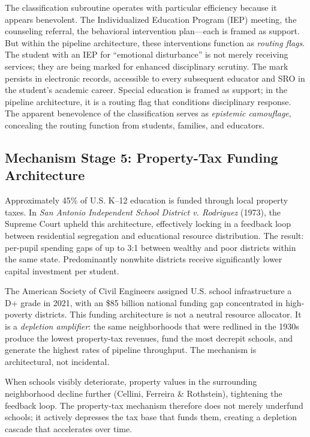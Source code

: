 The classification subroutine operates with particular efficiency because it appears benevolent. The Individualized Education Program (IEP) meeting, the counseling referral, the behavioral intervention plan---each is framed as support. But within the pipeline architecture, these interventions function as \textit{routing flags}. The student with an IEP for ``emotional disturbance'' is not merely receiving services; they are being marked for enhanced disciplinary scrutiny. The mark persists in electronic records, accessible to every subsequent educator and SRO in the student's academic career. Special education is framed as support; in the pipeline architecture, it is a routing flag that conditions disciplinary response. The apparent benevolence of the classification serves as \textit{epistemic camouflage}, concealing the routing function from students, families, and educators.

\subsection{Mechanism Stage 5: Property-Tax Funding Architecture}

Approximately 45\% of U.S. K--12 education is funded through local property taxes. In \textit{San Antonio Independent School District v. Rodriguez} (1973), the Supreme Court upheld this architecture, effectively locking in a feedback loop between residential segregation and educational resource distribution. The result: per-pupil spending gaps of up to 3:1 between wealthy and poor districts within the same state. Predominantly nonwhite districts receive significantly lower capital investment per student.

The American Society of Civil Engineers assigned U.S. school infrastructure a D+ grade in 2021, with an \$85 billion national funding gap concentrated in high-poverty districts. This funding architecture is not a neutral resource allocator. It is a \textit{depletion amplifier}: the same neighborhoods that were redlined in the 1930s produce the lowest property-tax revenues, fund the most decrepit schools, and generate the highest rates of pipeline throughput. The mechanism is architectural, not incidental.

When schools visibly deteriorate, property values in the surrounding neighborhood decline further (Cellini, Ferreira \& Rothstein), tightening the feedback loop. The property-tax mechanism therefore does not merely underfund schools; it actively depresses the tax base that funds them, creating a depletion cascade that accelerates over time.

